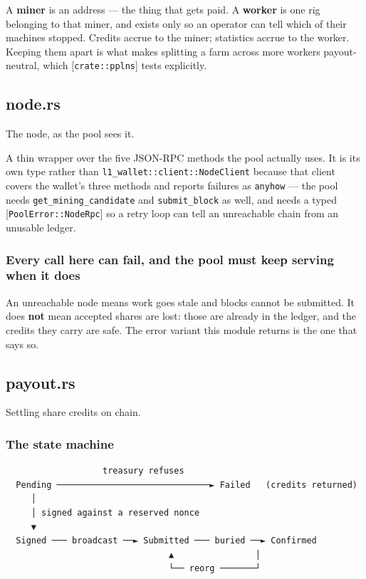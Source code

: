 \documentclass[11pt,a4paper]{article}
\begin{document}
A \textbf{miner} is an address — the thing that gets paid. A \textbf{worker} is one
rig belonging to that miner, and exists only so an operator can tell which
of their machines stopped. Credits accrue to the miner; statistics accrue to
the worker. Keeping them apart is what makes splitting a farm across more
workers payout-neutral, which [\texttt{crate::pplns}] tests explicitly.

\subsection{node.rs}
The node, as the pool sees it.

A thin wrapper over the five JSON-RPC methods the pool actually uses. It is
its own type rather than \texttt{l1\_wallet::client::NodeClient} because that client
covers the wallet's three methods and reports failures as \texttt{anyhow} — the
pool needs \texttt{get\_mining\_candidate} and \texttt{submit\_block} as well, and needs a
typed [\texttt{PoolError::NodeRpc}] so a retry loop can tell an unreachable chain
from an unusable ledger.

\subsubsection{Every call here can fail, and the pool must keep serving when it does}

An unreachable node means work goes stale and blocks cannot be submitted. It
does \textbf{not} mean accepted shares are lost: those are already in the ledger,
and the credits they carry are safe. The error variant this module returns
is the one that says so.

\subsection{payout.rs}
Settling share credits on chain.

\subsubsection{The state machine}

\begin{verbatim}
                   treasury refuses
  Pending ──────────────────────────────► Failed   (credits returned)
     │
     │ signed against a reserved nonce
     ▼
  Signed ─── broadcast ──► Submitted ─── buried ──► Confirmed
                                ▲                │
                                └── reorg ───────┘
\end{verbatim}
\end{document}
